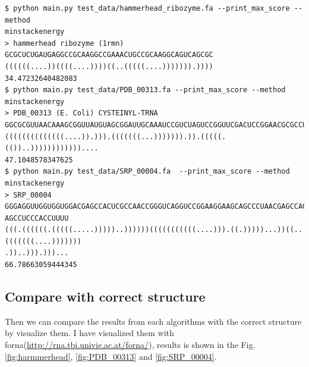 \documentclass[10pt]{article}
\begin{document}
\begin{lstlisting}[frame=single,breaklines=false]
$ python main.py test_data/hammerhead_ribozyme.fa --print_max_score --method
minstackenergy
> hammerhead ribozyme (1rmn)
GCGCUCUGAUGAGGCCGCAAGGCCGAAACUGCCGCAAGGCAGUCAGCGC
((((((....))((((....))))((..(((((....))))))).))))
34.47232640482083
$ python main.py test_data/PDB_00313.fa --print_max_score --method minstackenergy
> PDB_00313 (E. Coli) CYSTEINYL-TRNA
GGCGCGUUAACAAAGCGGUUAUGUAGCGGAUUGCAAAUCCGUCUAGUCCGGUUCGACUCCGGAACGCGCCUCCA
((((((((((((((....)).))).(((((((...))))))).)).(((((.(())..))))))))))))....
47.1048578347625
$ python main.py test_data/SRP_00004.fa  --print_max_score --method minstackenergy
> SRP_00004
GGGAGGUUGGUGGUGGACGAGCCACUCGCCAACCGGGUCAGGUCCGGAAGGAAGCAGCCCUAACGAGCCAGGCACGGGUCGCCGUGCC
AGCCUCCCACCUUUU
(((.((((((.(((((.....)))))..))))))(((((((((((....))).((.)))))...))((..(((((((....)))))))
.))..))).)))...
66.78663059444345
\end{lstlisting}

\subsection{Compare with correct structure}
\label{sec:compare}
Then we can compare the results from each algorithms with the correct structure by visualize them.
I have visualized them with forna(\url{http://rna.tbi.univie.ac.at/forna/}),
results is shown in the Fig.\ref{fig:harmmerhead}, \ref{fig:PDB_00313} and \ref{fig:SRP_00004}.
\end{document}
